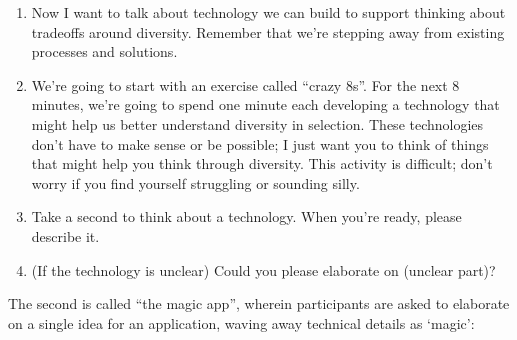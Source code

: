 \begin{enumerate}
    \item Now I want to talk about technology we can build to support thinking about tradeoffs around diversity. Remember that we're stepping away from existing processes and solutions.
    \item We're going to start with an exercise called ``crazy 8s''. For the next 8 minutes, we're going to spend one minute each developing a technology that might help us better understand diversity in selection. These technologies don't have to make sense or be possible; I just want you to think of things that might help you think through diversity. This activity is difficult; don't worry if you find yourself struggling or sounding silly.
    \item Take a second to think about a technology. When you're ready, please describe it.
    \item (If the technology is unclear) Could you please elaborate on (unclear part)?
\end{enumerate}

The second is called ``the magic app'', wherein participants are asked to elaborate on a single idea for an application, waving away technical details as `magic':

